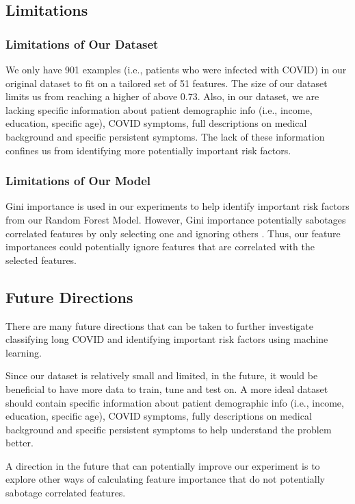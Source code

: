 \documentclass{article}
\begin{document}
\subsection{Limitations}

\subsubsection{Limitations of Our Dataset}
We only have 901 examples (i.e., patients who were infected with COVID) in our original dataset to fit on a tailored set of 51 features. The size of our dataset limits us from reaching a higher of above $0.73$. Also, in our dataset, we are lacking specific information about patient demographic info (i.e., income, education, specific age), COVID symptoms, full descriptions on medical background and specific persistent symptoms. The lack of these information confines us from identifying more potentially important risk factors.  

\subsubsection{Limitations of Our Model}
Gini importance is used in our experiments to help identify important risk factors from our Random Forest Model. However, Gini importance potentially sabotages correlated features by only selecting one and ignoring others \citep{Strobl2007}. Thus, our feature importances could potentially ignore features that are correlated with the selected features.  


\subsection{Future Directions}

There are many future directions that can be taken to further investigate classifying long COVID and identifying important risk factors using machine learning. 


Since our dataset is relatively small and limited, in the future, it would be beneficial to have more data to train, tune and test on. A more ideal dataset should contain specific information about patient demographic info (i.e., income, education, specific age), COVID symptoms, fully descriptions on medical background and specific persistent symptoms to help understand the problem better. 

A direction in the future that can potentially improve our experiment is to explore other ways of calculating feature importance that do not potentially sabotage correlated features. 
\end{document}
